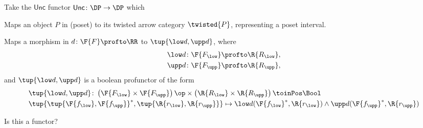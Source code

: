 Take the $\mathsf{Unc}$ functor $\mathsf{Unc}\colon \DP\to \DP$ which
\begin{compactenum}
  \item Maps an object $P$ in \DP (poset) to its twisted arrow category $\twisted{P}$, representing a poset interval.
  \item Maps a morphism in \DP $d\colon \F{F}\profto \RR$ to $\tup{\low d,\upp d}$, where
  \begin{equation}
    \begin{aligned}
      \low d\colon \F{F_{\low}}&\profto \R{R_{\low}},\\
      \upp d\colon \F{F_{\upp}}&\profto \R{R_{\upp}},
    \end{aligned}
  \end{equation}
  and $\tup{\low d,\upp d}$ is a boolean profunctor of the form
  \begin{equation}
    \begin{aligned}
      &\tup{\low d,\upp d}\colon \left(\F{F_{\low}}\times \F{F_{\upp}} \right)\op \times \left(\R{R_{\low}}\times \R{R_{\upp}} \right)\toinPos \Bool\\
      &\tup{\tup{\F{f_{\low}},\F{f_{\upp}}}^*,\tup{\R{r_{\low}},\R{r_{\upp}}}}\mapsto \low d(\F{f_{\low}}^*,\R{r_{\low}})\wedge \upp d(\F{f_{\upp}}^*,\R{r_{\upp}})
    \end{aligned}
  \end{equation}
\end{compactenum}

Is this a functor?

